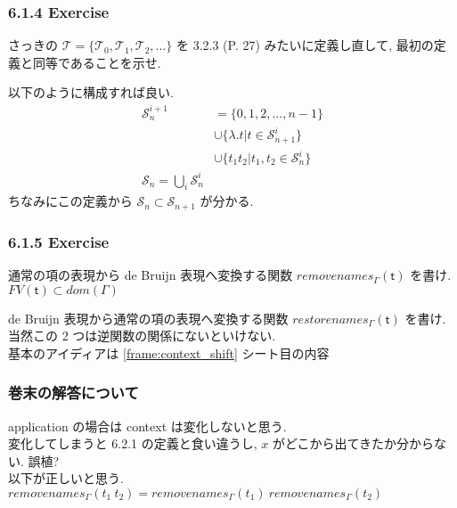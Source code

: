 \documentclass[13pt,dvipdfm]{beamer}
\begin{document}
\frame
{
  \frametitle{6.1.4 Exercise}
  さっきの $\mathcal{T} = \{\mathcal{T}_0, \mathcal{T}_1, \mathcal{T}_2,\dots\}$
  を 3.2.3 (P. 27) みたいに定義し直して, 最初の定義と同等であることを示せ.

  以下のように構成すれば良い.
  \begin{align*}
    \mathcal{S}_n^{i+1} &= \{0, 1, 2,..., n-1\} \\
    &\cup \{\lambda.t | t \in \mathcal{S}_{n+1}^i \} \\
    &\cup \{t_1 t_2 | t_1, t_2 \in \mathcal{S}_n^i\} \\
    \mathcal{S}_n = \bigcup_i \mathcal{S}_n^i
  \end{align*}
 ちなみにこの定義から $\mathcal{S}_n \subset \mathcal{S}_{n+1}$ が分かる.
}

\frame
{
}

\frame
{
  \frametitle{6.1.5 Exercise}
  通常の項の表現から de Bruijn 表現へ変換する関数 $removenames_\Gamma (\mathsf{t})$ を書け.
  $FV(\mathsf{t}) \subset dom(\Gamma)$

  de Bruijn 表現から通常の項の表現へ変換する関数 $restorenames_\Gamma (\mathsf{t})$ を書け.\\
  当然この 2 つは逆関数の関係にないといけない. \\
  基本のアイディアは \ref{frame:context_shift} シート目の内容
}

\frame
{
  \frametitle{巻末の解答について}
  application の場合は context は変化しないと思う.\\
  変化してしまうと 6.2.1 の定義と食い違うし, $x$ がどこから出てきたか分からない. 誤植? \\
  以下が正しいと思う.\\
  $removenames_\Gamma (t_1\ t_2) = removenames_\Gamma (t_1)\ removenames_\Gamma (t_2)$
}
\end{document}
